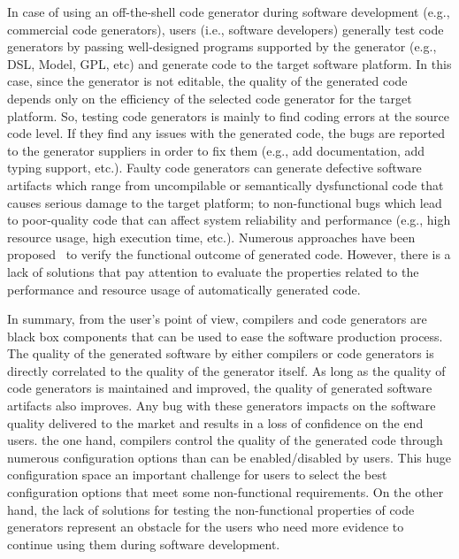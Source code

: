 In case of using an off-the-shell code generator during software development (e.g., commercial code generators), 
users (i.e., software developers) generally test code generators by passing well-designed programs supported by the generator (e.g., DSL, Model, GPL, etc) and generate code to the target software platform. 
In this case, since the generator is not editable, the quality of the generated code depends only on the efficiency of the selected code generator for the target platform. So, testing code generators is mainly to find coding errors at the source code level. If they find any issues with the generated code, the bugs are reported to the generator suppliers in order to fix them (e.g., add documentation, add typing support, etc.).
Faulty code generators can generate defective software artifacts which range from uncompilable or semantically dysfunctional code that causes serious damage to the target platform; to non-functional bugs which lead to poor-quality code that can affect system reliability and performance (e.g., high resource usage, high execution time, etc.).
Numerous approaches have been proposed~\cite{stuermer2007systematic,yang2011finding} to verify the functional outcome of generated code. However, there is a lack of solutions that pay attention to evaluate the properties related to the performance and resource usage of automatically generated code.


In summary, from the user's point of view, compilers and code generators are black box components that can be used to ease the software production process. The quality of the generated software by either compilers or code generators is directly correlated to the quality of the generator itself. As long as the quality of code generators is maintained and improved, the quality of generated software artifacts also improves. Any bug with these generators impacts on the software quality delivered to the market and results in a loss of confidence on the end users.
 the one hand, compilers control the quality of the generated code through numerous configuration options than can be enabled/disabled by users. This huge configuration space  an important challenge for users to select the best configuration options that meet some non-functional requirements.
On the other hand, the lack of solutions for testing the non-functional properties of code generators represent an obstacle for the users who need more evidence to continue using them during software development.



